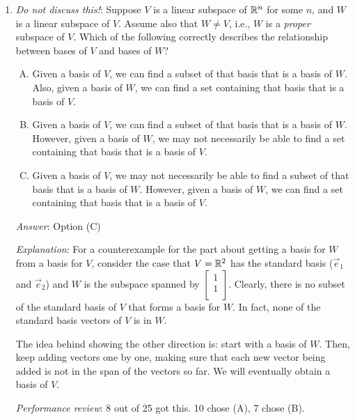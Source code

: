 \documentclass[10pt]{amsart}
\begin{document}
\begin{enumerate}
  {\em Performance review}: 14 out of 25 got this. 6 chose (C), 5 chose (B).

\item {\em Do not discuss this!}: Suppose $V$ is a linear subspace of
  $\mathbb{R}^n$ for some $n$, and $W$ is a linear subspace of $V$. Assume
  also that $W \ne V$, i.e., $W$ is a {\em proper} subspace of
  $V$. Which of the following correctly describes the relationship
  between bases of $V$ and bases of $W$?

  \begin{enumerate}[(A)]
  \item Given a basis of $V$, we can find a subset of that basis that
    is a basis of $W$. Also, given a basis of $W$, we can find a set
    containing that basis that is a basis of $V$.
  \item Given a basis of $V$, we can find a subset of that basis that
    is a basis of $W$. However, given a basis of $W$, we may not
    necessarily be able to find a set containing that basis that is a
    basis of $V$.
  \item Given a basis of $V$, we may not necessarily be able to find a
    subset of that basis that is a basis of $W$. However, given a
    basis of $W$, we can find a set containing that basis that is a
    basis of $V$.
  \end{enumerate}

  {\em Answer}: Option (C)

  {\em Explanation}: For a counterexample for the part about getting a
  basis for $W$ from a basis for $V$, consider the case that $V =
  \mathbb{R}^2$ has the standard basis ($\vec{e}_1$ and $\vec{e}_2$) and $W$
  is the subspace spanned by $\left[ \begin{matrix} 1 \\ 1
      \\\end{matrix}\right]$. Clearly, there is no subset of the
  standard basis of $V$ that forms a basis for $W$. In fact, none of
  the standard basis vectors of $V$ is in $W$.

  The idea behind showing the other direction is: start with a basis
  of $W$. Then, keep adding vectors one by one, making sure that each
  new vector being added is not in the span of the vectors so far. We
  will eventually obtain a basis of $V$.

  {\em Performance review}: 8 out of 25 got this. 10 chose (A), 7
  chose (B).
\end{enumerate}
\end{document}

